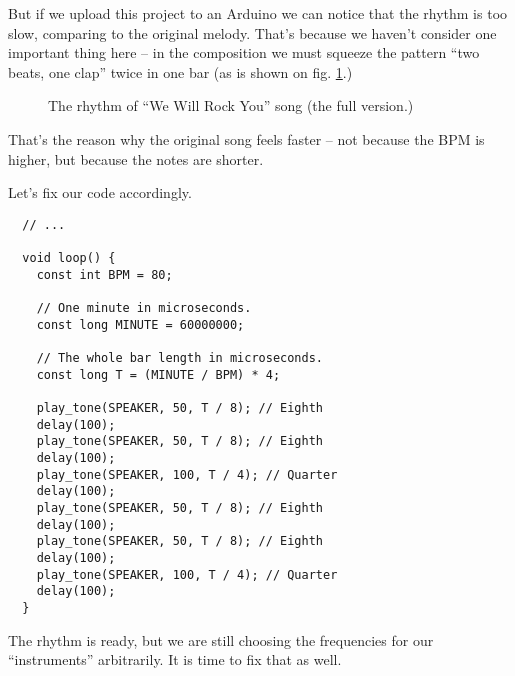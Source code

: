 \documentclass[../sparc.tex]{subfiles}
\begin{document}
But if we upload this project to an Arduino we can notice that the rhythm is too
slow, comparing to the original melody.  That's because we haven't consider one
important thing here -- in the composition we must squeeze the pattern ``two
beats, one clap'' twice in one bar (as is shown on
fig. \ref{fig:lilypond-queen-2}.)

\begin{figure}[ht]
  \centering
  \caption{The rhythm of ``We Will Rock You'' song (the full version.)}
  \label{fig:lilypond-queen-2}
\end{figure}

That's the reason why the original song feels faster -- not because the BPM is
higher, but because the notes are shorter.

Let's fix our code accordingly.

\begin{verbatim}
  // ...

  void loop() {
    const int BPM = 80;

    // One minute in microseconds.
    const long MINUTE = 60000000;

    // The whole bar length in microseconds.
    const long T = (MINUTE / BPM) * 4;

    play_tone(SPEAKER, 50, T / 8); // Eighth
    delay(100);
    play_tone(SPEAKER, 50, T / 8); // Eighth
    delay(100);
    play_tone(SPEAKER, 100, T / 4); // Quarter
    delay(100);
    play_tone(SPEAKER, 50, T / 8); // Eighth
    delay(100);
    play_tone(SPEAKER, 50, T / 8); // Eighth
    delay(100);
    play_tone(SPEAKER, 100, T / 4); // Quarter
    delay(100);
  }
\end{verbatim}

The rhythm is ready, but we are still choosing the frequencies for our
``instruments'' arbitrarily.  It is time to fix that as well.
\end{document}
